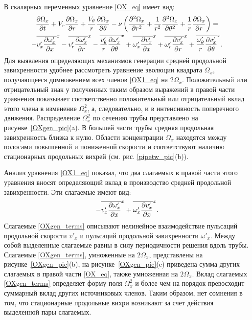 В скалярных переменных уравнение \eqref{OX_eq} имеет вид:
\begin{multline}\label{OX1_eq}
\frac{\partial \Omega_x}{\partial t} + V_r \frac{\partial \Omega_x}{\partial r} + \frac{V_\theta}{r} \frac{\partial \Omega_x}{\partial \theta}
 - \nu\left(\frac{\partial ^2\Omega_x}{\partial r^2} + \frac{1}{r^2}\frac{\partial ^2\Omega_x}{\partial \theta^2} + \frac{1}{r}\frac{\partial \Omega_x}{\partial r}\right)= \\
 - \overline{v'_x \frac{\partial \omega'_x}{\partial x}}^x - \overline{v'_r \frac{\partial \omega'_x}{\partial r}}^x - \overline{\frac{v'_\theta}{r} \frac{\partial \omega'_x}{\partial \theta}}^x
 + \overline{\omega'_x \frac{\partial v'_x}{\partial x}}^x + \overline{\omega'_r \frac{\partial v'_x}{\partial r}}^x + \overline{\frac{\omega'_\theta}{r} \frac{\partial v'_x}{\partial \theta}}^x.
\end{multline}
Для выявления определяющих механизмов генерации средней продольной завихренности удобнее рассмотреть уравнение эволюции квадрата $\Omega_x$, получающееся домножением всех членов \eqref{OX1_eq} на $2\Omega_x$. Положительный или отрицательный знак у полученных таким образом выражений в правой части уравнения показывает соответственно положительный или отрицательный вклад этого члена в изменение $\Omega_x^2$, а, следовательно, и в интенсивность поперечного движения. Распределение $\Omega_x^2$ по сечению трубы представлено на рисунке~\ref{OXgen_pic}(a). В большей части трубы средняя продольная завихренность близка к нулю. Области концентрации $\Omega_x$ находятся между полосами повышенной и пониженной скорости и соответствуют наличию стационарных продольных вихрей (см. рис. \ref{pipetw_pic}(b)). 

Анализ уравнения \eqref{OX1_eq} показал, что два слагаемых в правой части этого уравнения вносят определяющий вклад в производство средней продольной завихренности. Эти слагаемые имеют вид:
\begin{equation}\label{OXgen_terms}
- \overline{v'_x \frac{\partial \omega'_x}{\partial x}}^x + \overline{ \omega'_x \frac{\partial v'_x}{\partial x} }^x.
\end{equation}
Слагаемые \eqref{OXgen_terms} описывают нелинейное взаимодействие пульсаций продольной скорости $v'_x$ и пульсаций продольной завихренности $\omega'_x$. Между собой выделенные слагаемые равны в силу периодичности решения вдоль трубы. Слагаемые \eqref{OXgen_terms}, умноженные на $2\Omega_x$, представлены на рисунке~\ref{OXgen_pic}(b), на рисунке~\ref{OXgen_pic}(c) приведена сумма других слагаемых в правой части \eqref{OX_eq}, также умноженная на $2\Omega_x$. Вклад слагаемых \eqref{OXgen_terms} определяет форму поля $\Omega_x^2$ и более чем на порядок превосходит суммарный вклад других источниковых членов. Таким образом, нет сомнения в том, что стационарные продольные вихри возникают за счет действия выделенной пары слагаемых.


